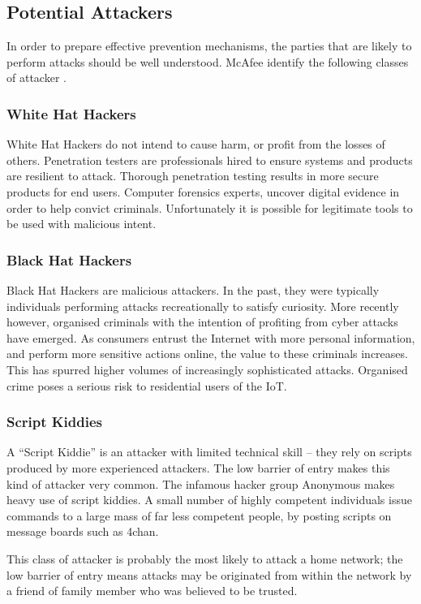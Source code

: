 \documentclass[10pt,journal,compsoc]{IEEEtran}
\begin{document}
\subsection{Potential Attackers}
In order to prepare effective prevention mechanisms, the parties that are
likely to perform attacks should be well understood. McAfee identify the
following classes of attacker \cite{McAfee2011}.  

\subsubsection{White Hat Hackers}
White Hat Hackers do not intend to cause harm, or profit from the losses of
others. Penetration testers are professionals hired to ensure systems and
products are resilient to attack. Thorough penetration testing results in more
secure products for end users. Computer forensics experts, uncover digital
evidence in order to help convict criminals. Unfortunately it is possible for
legitimate tools to be used with malicious intent.

\subsubsection{Black Hat Hackers}
Black Hat Hackers are malicious attackers. In the past, they were typically
individuals performing attacks recreationally to satisfy curiosity. More
recently however, organised criminals with the intention of profiting from
cyber attacks have emerged. As consumers entrust the Internet with more
personal information, and perform more sensitive actions online, the value to
these criminals increases. This has spurred higher volumes of increasingly
sophisticated attacks. Organised crime poses a serious risk to residential
users of the IoT. 

\subsubsection{Script Kiddies}
A ``Script Kiddie'' is an attacker with limited technical skill -- they
rely on scripts produced by more experienced attackers. The low barrier of
entry makes this kind of attacker very common. The infamous hacker group
Anonymous makes heavy use of script kiddies. A small number of highly competent
individuals issue commands to a large mass of far less competent people, by
posting scripts on message boards such as 4chan. 

This class of attacker is probably the most likely to attack a home network;
the low barrier of entry means attacks may be originated from within the
network by a friend of family member who was believed to be trusted.  
\end{document}
